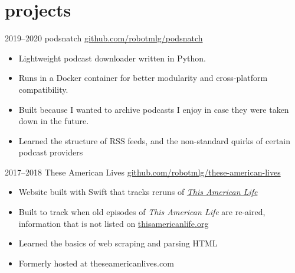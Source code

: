 \documentclass[]{friggeri-mlg-cv} %
\begin{document}
\section{projects}
\begin{entrylist}
\entry
{2019--2020}
{podsnatch}
{\href{https://github.com/robotmlg/podsnatch}{github.com/robotmlg/podsnatch}}
{
\begin{itemize}[leftmargin=*]
\item Lightweight podcast downloader written in Python. 
\item Runs in a Docker container for better modularity and cross-platform compatibility.
\item Built because I wanted to archive podcasts I enjoy in case they were taken down in the future.  
\item Learned the structure of RSS feeds, and the non-standard quirks of certain 
podcast providers
\end{itemize}
}
\entry
{2017--2018}
{These American Lives}
{\href{https://github.com/robotmlg/these-american-lives}{github.com/robotmlg/these-american-lives}}
{\begin{itemize}[leftmargin=*]
\item Website built with Swift that tracks reruns of 
\href{https://thisamericanlife.org}{\emph{This American Life}}
\item Built to track when old episodes of \emph{This American Life} are re-aired,
information that is not listed on
\href{https://thisamericanlife.org}{thisamericanlife.org}
\item Learned the basics of web scraping and parsing HTML
\item Formerly hosted at theseamericanlives.com
\end{itemize}}

\end{entrylist}
\end{document}
